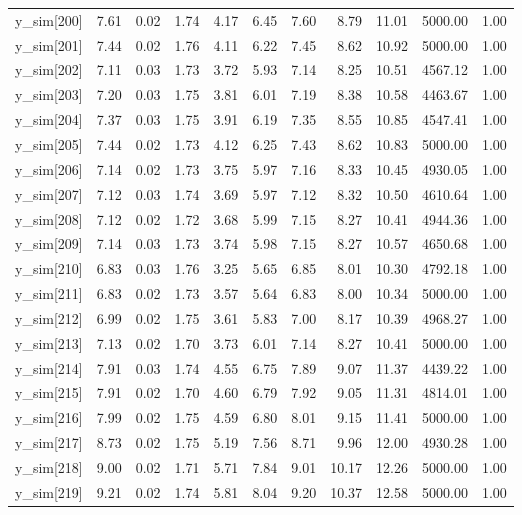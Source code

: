 \begin{table}[ht]
\begin{tabular}{rrrrrrrrrrr}
  y\_sim[200] & 7.61 & 0.02 & 1.74 & 4.17 & 6.45 & 7.60 & 8.79 & 11.01 & 5000.00 & 1.00 \\ 
  y\_sim[201] & 7.44 & 0.02 & 1.76 & 4.11 & 6.22 & 7.45 & 8.62 & 10.92 & 5000.00 & 1.00 \\ 
  y\_sim[202] & 7.11 & 0.03 & 1.73 & 3.72 & 5.93 & 7.14 & 8.25 & 10.51 & 4567.12 & 1.00 \\ 
  y\_sim[203] & 7.20 & 0.03 & 1.75 & 3.81 & 6.01 & 7.19 & 8.38 & 10.58 & 4463.67 & 1.00 \\ 
  y\_sim[204] & 7.37 & 0.03 & 1.75 & 3.91 & 6.19 & 7.35 & 8.55 & 10.85 & 4547.41 & 1.00 \\ 
  y\_sim[205] & 7.44 & 0.02 & 1.73 & 4.12 & 6.25 & 7.43 & 8.62 & 10.83 & 5000.00 & 1.00 \\ 
  y\_sim[206] & 7.14 & 0.02 & 1.73 & 3.75 & 5.97 & 7.16 & 8.33 & 10.45 & 4930.05 & 1.00 \\ 
  y\_sim[207] & 7.12 & 0.03 & 1.74 & 3.69 & 5.97 & 7.12 & 8.32 & 10.50 & 4610.64 & 1.00 \\ 
  y\_sim[208] & 7.12 & 0.02 & 1.72 & 3.68 & 5.99 & 7.15 & 8.27 & 10.41 & 4944.36 & 1.00 \\ 
  y\_sim[209] & 7.14 & 0.03 & 1.73 & 3.74 & 5.98 & 7.15 & 8.27 & 10.57 & 4650.68 & 1.00 \\ 
  y\_sim[210] & 6.83 & 0.03 & 1.76 & 3.25 & 5.65 & 6.85 & 8.01 & 10.30 & 4792.18 & 1.00 \\ 
  y\_sim[211] & 6.83 & 0.02 & 1.73 & 3.57 & 5.64 & 6.83 & 8.00 & 10.34 & 5000.00 & 1.00 \\ 
  y\_sim[212] & 6.99 & 0.02 & 1.75 & 3.61 & 5.83 & 7.00 & 8.17 & 10.39 & 4968.27 & 1.00 \\ 
  y\_sim[213] & 7.13 & 0.02 & 1.70 & 3.73 & 6.01 & 7.14 & 8.27 & 10.41 & 5000.00 & 1.00 \\ 
  y\_sim[214] & 7.91 & 0.03 & 1.74 & 4.55 & 6.75 & 7.89 & 9.07 & 11.37 & 4439.22 & 1.00 \\ 
  y\_sim[215] & 7.91 & 0.02 & 1.70 & 4.60 & 6.79 & 7.92 & 9.05 & 11.31 & 4814.01 & 1.00 \\ 
  y\_sim[216] & 7.99 & 0.02 & 1.75 & 4.59 & 6.80 & 8.01 & 9.15 & 11.41 & 5000.00 & 1.00 \\ 
  y\_sim[217] & 8.73 & 0.02 & 1.75 & 5.19 & 7.56 & 8.71 & 9.96 & 12.00 & 4930.28 & 1.00 \\ 
  y\_sim[218] & 9.00 & 0.02 & 1.71 & 5.71 & 7.84 & 9.01 & 10.17 & 12.26 & 5000.00 & 1.00 \\ 
  y\_sim[219] & 9.21 & 0.02 & 1.74 & 5.81 & 8.04 & 9.20 & 10.37 & 12.58 & 5000.00 & 1.00 \\ 

\end{tabular}
\end{table}
